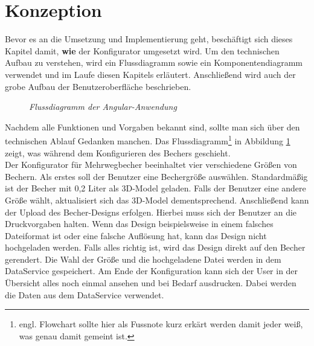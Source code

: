 \section{Konzeption}
\label{sec:konzept}
%
Bevor es an die Umsetzung und Implementierung geht, beschäftigt sich dieses Kapitel damit, \textbf{wie} der Konfigurator umgesetzt wird. Um den technischen Aufbau zu verstehen, wird ein Flussdiagramm sowie ein Komponentendiagramm verwendet und im Laufe diesen Kapitels erläutert. Anschließend wird auch der grobe Aufbau der Benutzeroberfläche beschrieben.
\begin{figure}[h]
	\centering
	{}
	\caption[Flussdiagramm]{\textit{Flussdiagramm der Angular-Anwendung}}
	\label{fig:flowchart}
\end{figure}
 Nachdem alle Funktionen und Vorgaben bekannt sind, sollte man sich über den technischen Ablauf Gedanken manchen. Das Flussdiagramm\footnote{engl. Flowchart sollte hier als Fussnote kurz erkärt werden damit jeder weiß, was genau damit gemeint ist.} in Abbildung \ref{fig:flowchart} zeigt, was während dem Konfigurieren des Bechers geschieht.\\
 Der Konfigurator für Mehrwegbecher beeinhaltet vier verschiedene Größen von Bechern. Als erstes soll der Benutzer eine Bechergröße auswählen. Standardmäßig ist der Becher mit 0,2 Liter als 3D-Model geladen. Falls der Benutzer eine andere Größe wählt, aktualisiert sich das 3D-Model dementsprechend. Anschließend kann der Upload des Becher-Designs erfolgen. Hierbei muss sich der Benutzer an die Druckvorgaben halten. Wenn das Design beispielsweise in einem falsches Dateiformat ist oder eine falsche Auflösung hat, kann das Design nicht hochgeladen werden. Falls alles richtig ist, wird das Design direkt auf den Becher gerendert. Die Wahl der Größe und die hochgeladene Datei werden in dem DataService gespeichert. Am Ende der Konfiguration kann sich der User in der Übersicht alles noch einmal ansehen und bei Bedarf ausdrucken. Dabei werden die Daten aus dem DataService verwendet.  
 
